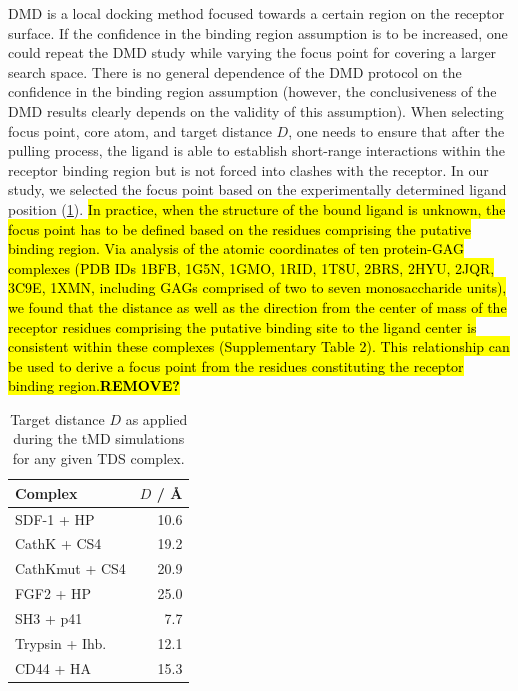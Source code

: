DMD is a local docking method focused towards a certain region on the receptor
surface. If the confidence in the binding region assumption is to be increased,
one could repeat the DMD study while varying the focus point for covering a
larger search space. There is no general dependence of the DMD protocol on the
confidence in the binding region assumption (however, the conclusiveness of the
DMD results clearly depends on the validity of this assumption). When selecting
focus point, core atom, and target distance $D$, one needs to ensure that after
the pulling process, the ligand is able to establish short-range interactions
within the receptor binding region but is not forced into clashes with the
receptor. In our study, we selected the focus point based on the experimentally
determined ligand position (\cref{tab:dmd:tds_target_distances}). \hl{In
practice, when the structure of the bound ligand is unknown, the focus point has
to be defined based on the residues comprising the putative binding region. Via
analysis of the atomic coordinates of ten protein-GAG complexes (PDB IDs 1BFB,
1G5N, 1GMO, 1RID, 1T8U, 2BRS, 2HYU, 2JQR, 3C9E, 1XMN, including GAGs comprised
of two to seven monosaccharide units), we found that the distance as well as the
direction from the center of mass of the receptor residues comprising the
putative binding site to the ligand center is consistent within these complexes
(Supplementary Table 2). This relationship can be used to derive a focus point
from the residues constituting the receptor binding region.\textbf{REMOVE?}}

\begin{table}
\scriptsize
\centering
\renewcommand{\arraystretch}{1.3}
\begin{tabular}{@{}lr@{}}
\toprule
Complex & $D$ / \si{\angstrom} \\
\midrule
SDF-1 + HP & 10.6 \\
CathK + CS4 & 19.2 \\
CathKmut + CS4 & 20.9 \\
FGF2 + HP & 25.0 \\
SH3 + p41 & 7.7 \\
Trypsin + Ihb. & 12.1 \\
CD44 + HA & 15.3 \\
\bottomrule
\end{tabular}
\caption{
Target distance $D$ as applied during the tMD simulations for any given TDS complex.
}
\label{tab:dmd:tds_target_distances}
\end{table}

